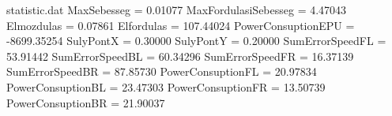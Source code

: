 \begin{filecontents*}{statistic.dat}
MaxSebesseg =    0.01077
MaxFordulasiSebesseg =    4.47043
Elmozdulas =    0.07861
Elfordulas =  107.44024
PowerConsuptionEPU = -8699.35254
SulyPontX =    0.30000
SulyPontY =    0.20000
SumErrorSpeedFL =  53.91442
SumErrorSpeedBL =  60.34296
SumErrorSpeedFR =   16.37139
SumErrorSpeedBR =   87.85730
PowerConsuptionFL =   20.97834
PowerConsuptionBL =   23.47303
PowerConsuptionFR =  13.50739
PowerConsuptionBR =  21.90037
\end{filecontents*}
